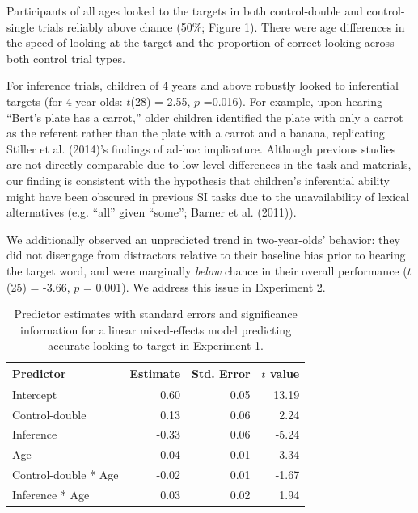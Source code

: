 \documentclass[a4paper,man,apacite,floatsintext]{apa6}
\begin{document}
Participants of all ages looked to the targets in both control-double
and control-single trials reliably above chance (50\%; Figure 1). There
were age differences in the speed of looking at the target and the
proportion of correct looking across both control trial types.

For inference trials, children of 4 years and above robustly looked to
inferential targets (for 4-year-olds: \(t\)(28) = 2.55, \(p\) =0.016).
For example, upon hearing ``Bert's plate has a carrot,'' older children
identified the plate with only a carrot as the referent rather than the
plate with a carrot and a banana, replicating Stiller et al. (2014)'s
findings of ad-hoc implicature. Although previous studies are not
directly comparable due to low-level differences in the task and
materials, our finding is consistent with the hypothesis that children's
inferential ability might have been obscured in previous SI tasks due to
the unavailability of lexical alternatives (e.g. ``all'' given ``some'';
Barner et al. (2011)).

We additionally observed an unpredicted trend in two-year-olds'
behavior: they did not disengage from distractors relative to their
baseline bias prior to hearing the target word, and were marginally
\emph{below} chance in their overall performance (\(t\)(25) = -3.66,
\(p\) = 0.001). We address this issue in Experiment 2.

\begin{table}[tb]
\centering
\begin{tabular}{lrrr}
 Predictor & Estimate & Std. Error & $t$ value \\ 
  \hline
Intercept & 0.60 & 0.05 & 13.19 \\ 
  Control-double & 0.13 & 0.06 & 2.24 \\ 
  Inference & -0.33 & 0.06 & -5.24 \\ 
  Age & 0.04 & 0.01 & 3.34 \\ 
  Control-double * Age & -0.02 & 0.01 & -1.67 \\ 
  Inference * Age & 0.03 & 0.02 & 1.94 \\ 
   \hline
\end{tabular}
\caption{Predictor estimates with standard errors and significance information for a linear mixed-effects model predicting accurate looking to target in Experiment 1.} 
\label{tab:exp1_tab}
\end{table}
\end{document}
